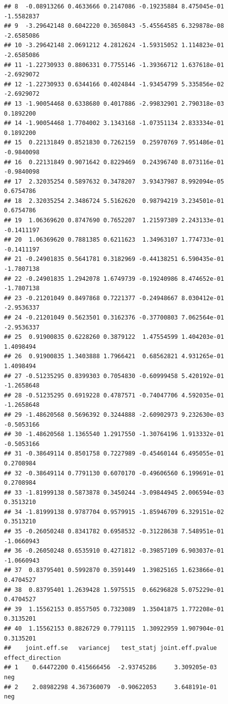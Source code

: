 \documentclass[
]{article}
\begin{document}
\begin{verbatim}
## 8  -0.08913266 0.4633666 0.2147086 -0.19235884 8.475045e-01 -1.5582837
## 9  -3.29642148 0.6042220 0.3650843 -5.45564585 6.329878e-08 -2.6585086
## 10 -3.29642148 2.0691212 4.2812624 -1.59315052 1.114823e-01 -2.6585086
## 11 -1.22730933 0.8806331 0.7755146 -1.39366712 1.637618e-01 -2.6929072
## 12 -1.22730933 0.6344166 0.4024844 -1.93454799 5.335856e-02 -2.6929072
## 13 -1.90054468 0.6338680 0.4017886 -2.99832901 2.790318e-03  0.1892200
## 14 -1.90054468 1.7704002 3.1343168 -1.07351134 2.833334e-01  0.1892200
## 15  0.22131849 0.8521830 0.7262159  0.25970769 7.951486e-01 -0.9840098
## 16  0.22131849 0.9071642 0.8229469  0.24396740 8.073116e-01 -0.9840098
## 17  2.32035254 0.5897632 0.3478207  3.93437987 8.992094e-05  0.6754786
## 18  2.32035254 2.3486724 5.5162620  0.98794219 3.234501e-01  0.6754786
## 19  1.06369620 0.8747690 0.7652207  1.21597389 2.243133e-01 -0.1411197
## 20  1.06369620 0.7881385 0.6211623  1.34963107 1.774733e-01 -0.1411197
## 21 -0.24901835 0.5641781 0.3182969 -0.44138251 6.590435e-01 -1.7807138
## 22 -0.24901835 1.2942078 1.6749739 -0.19240986 8.474652e-01 -1.7807138
## 23 -0.21201049 0.8497868 0.7221377 -0.24948667 8.030412e-01 -2.9536337
## 24 -0.21201049 0.5623501 0.3162376 -0.37700803 7.062564e-01 -2.9536337
## 25  0.91900835 0.6228260 0.3879122  1.47554599 1.404203e-01  1.4098494
## 26  0.91900835 1.3403888 1.7966421  0.68562821 4.931265e-01  1.4098494
## 27 -0.51235295 0.8399303 0.7054830 -0.60999458 5.420192e-01 -1.2658648
## 28 -0.51235295 0.6919228 0.4787571 -0.74047706 4.592035e-01 -1.2658648
## 29 -1.48620568 0.5696392 0.3244888 -2.60902973 9.232630e-03 -0.5053166
## 30 -1.48620568 1.1365540 1.2917550 -1.30764196 1.913332e-01 -0.5053166
## 31 -0.38649114 0.8501758 0.7227989 -0.45460144 6.495055e-01  0.2708984
## 32 -0.38649114 0.7791130 0.6070170 -0.49606560 6.199691e-01  0.2708984
## 33 -1.81999138 0.5873878 0.3450244 -3.09844945 2.006594e-03  0.3513210
## 34 -1.81999138 0.9787704 0.9579915 -1.85946709 6.329151e-02  0.3513210
## 35 -0.26050248 0.8341782 0.6958532 -0.31228638 7.548951e-01 -1.0660943
## 36 -0.26050248 0.6535910 0.4271812 -0.39857109 6.903037e-01 -1.0660943
## 37  0.83795401 0.5992870 0.3591449  1.39825165 1.623866e-01  0.4704527
## 38  0.83795401 1.2639428 1.5975515  0.66296828 5.075229e-01  0.4704527
## 39  1.15562153 0.8557505 0.7323089  1.35041875 1.772208e-01  0.3135201
## 40  1.15562153 0.8826729 0.7791115  1.30922959 1.907904e-01  0.3135201
##    joint.eff.se   variancej   test_statj joint.eff.pvalue effect_direction
## 1    0.64472200 0.415666456  -2.93745286     3.309205e-03              neg
## 2    2.08982298 4.367360079  -0.90622053     3.648191e-01              neg

\end{verbatim}
\end{document}
